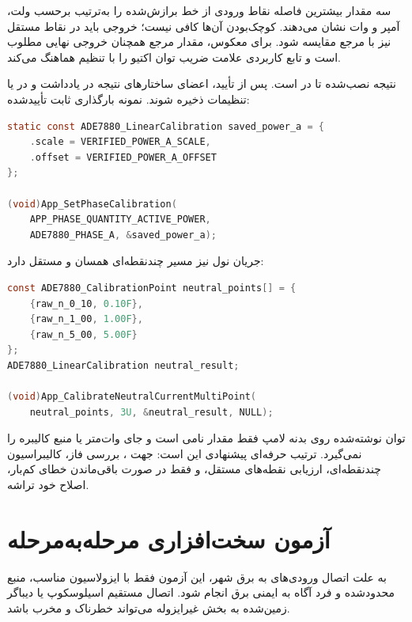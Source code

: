 سه مقدار  بیشترین فاصله نقاط ورودی از خط برازش‌شده را به‌ترتیب برحسب ولت، آمپر و وات نشان می‌دهند. کوچک‌بودن آن‌ها کافی نیست؛ خروجی باید در نقاط مستقل نیز با مرجع مقایسه شود. برای  معکوس، مقدار مرجع همچنان خروجی نهایی مطلوب است و تابع کاربردی علامت ضریب توان اکتیو را با تنظیم  هماهنگ می‌کند.

نتیجه نصب‌شده تا  در  است. پس از تأیید، اعضای  ساختارهای نتیجه در  یادداشت و در  یا تنظیمات  ذخیره شوند. نمونه بارگذاری ثابت تأییدشده:

\begin{LTR}
\begin{lstlisting}[language=C]
static const ADE7880_LinearCalibration saved_power_a = {
    .scale = VERIFIED_POWER_A_SCALE,
    .offset = VERIFIED_POWER_A_OFFSET
};

(void)App_SetPhaseCalibration(
    APP_PHASE_QUANTITY_ACTIVE_POWER,
    ADE7880_PHASE_A, &saved_power_a);
\end{lstlisting}
\end{LTR}

جریان نول نیز مسیر چندنقطه‌ای همسان و مستقل دارد:

\begin{LTR}
\begin{lstlisting}[language=C]
const ADE7880_CalibrationPoint neutral_points[] = {
    {raw_n_0_10, 0.10F},
    {raw_n_1_00, 1.00F},
    {raw_n_5_00, 5.00F}
};
ADE7880_LinearCalibration neutral_result;

(void)App_CalibrateNeutralCurrentMultiPoint(
    neutral_points, 3U, &neutral_result, NULL);
\end{lstlisting}
\end{LTR}

توان نوشته‌شده روی بدنه لامپ فقط مقدار نامی است و جای وات‌متر یا منبع کالیبره را نمی‌گیرد. ترتیب حرفه‌ای پیشنهادی این است: جهت ، بررسی فاز، کالیبراسیون  چندنقطه‌ای، ارزیابی نقطه‌های مستقل، و فقط در صورت باقی‌ماندن خطای کم‌بار، اصلاح  خود تراشه.

\section{آزمون سخت‌افزاری مرحله‌به‌مرحله}
به علت اتصال ورودی‌های  به برق شهر، این آزمون فقط با ایزولاسیون مناسب، منبع محدودشده و فرد آگاه به ایمنی برق انجام شود. اتصال مستقیم اسیلوسکوپ یا دیباگر زمین‌شده به بخش غیرایزوله می‌تواند خطرناک و مخرب باشد.

